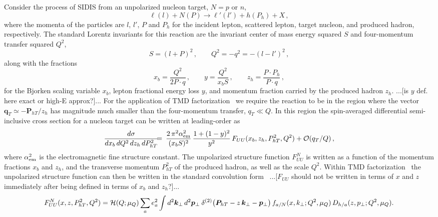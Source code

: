 \documentclass[final,3p,times,onecolumn,sort&compress,hidelinks]{elsarticle}
\newcommand{\xbj}{x_b}
\newcommand{\zh}{z_h}
\newcommand{\crd}{\color{red}}
\begin{document}
Consider the process of SIDIS from an unpolarized nucleon target,
$N=p$ or $n$,
%
\begin{equation}
\ell(l) + N(P) \to \ell'(l') + h(P_h) + X\,,
\end{equation}
%
where the momenta of the particles are $l$, $l'$, $P$ and $P_h$
for the incident lepton, scattered lepton, target nucleon, and
produced hadron, respectively.
%
The standard Lorentz invariants for this reaction are the invariant
center of mass energy squared $S$ and four-momentum transfer squared
$Q^2$,
%
\begin{equation}
S = (l+P)^2\,,
  \quad\quad
Q^2 = -q^2 = -(l-l')^2\,,
\end{equation}
%
along with the fractions
%
\begin{equation}
\xbj = \frac{Q^2} {2P\cdot q}\,,
  \quad\quad
y = \frac{Q^2} {\xbj S}\,,
  \quad\quad
\zh = \frac{P\cdot P_h} {P\cdot q}\,,
\end{equation}
%
for the Bjorken scaling variable $\xbj$,
lepton fractional energy loss $y$, and
momentum fraction carried by the produced hadron $\zh$.
{\color{red} ...[is $y$ def. here exact or high-E approx?]...}
%
For the application of TMD factorization~\cite{Collins:2011zzd}
we require the reaction to be in the region where the vector
	${\bm q}_T \simeq -{\bm P}_{hT}/\zh$
has magnitude much smaller than the four-momentum transfer,
	$q_T \ll Q$.
In this region the spin-averaged differential semi-inclusive cross
section for a nucleon target can be written at leading-order
as~\cite{Bacchetta:2006tn}
%
\begin{eqnarray}
\frac{d\sigma}
{d\xbj\, dQ^2 \, d\zh \, dP_{hT}^2}
&\!\!\!=\!\!\!&
  \frac{2 \, \pi^2 \alpha_{\rm em}^2}{(\xbj S)^2} \,
  \frac{1 + (1-y)^2 }{y^2}\,
  F_{UU}(\xbj,\zh,P_{hT}^2,Q^2)
+ \mathcal{O}(q_T/Q)\, ,
\label{e:dsigma}
\end{eqnarray}
%
where $\alpha_{\rm em}^2$ is the electromagnetic fine structure
constant.
The unpolarized structure function $F_{UU}^N$ is written as a
function of the momentum fractions $\xbj$ and $\zh$, and the
transverse momentum $P_{hT}^2$ of the produced hadron,
as well as the scale $Q^2$.
%
Within TMD factorization~\cite{Collins:2011zzd} the unpolarized
structure function can then be written in the standard convolution
form~\cite{Bacchetta:2006tn}
{\crd ...[$F_{UU}$ should not be written in terms of $x$ and $z$
immediately after being defined in terms of $\xbj$ and $\zh$?]...}
%
\begin{equation}
F_{UU}^N(x,z,P_{hT}^2,Q^2)
= {\cal H}(Q;\mu_Q)
  \sum_a e_a^2 
  \int d^2{\bm k}_\perp \, d^2{\bm p}_\perp
  \> \delta^{(2)}\big({\bm P}_{hT} - z\,{\bm k}_\perp -{\bm p}_\perp \big)\,
  f_{a/N}(x, k_\perp; Q^2, \mu_Q)\,
  D_{h/a}(z, p_\perp; Q^2, \mu_Q).
\label{e:FUU} 
\end{equation}
\end{document}
